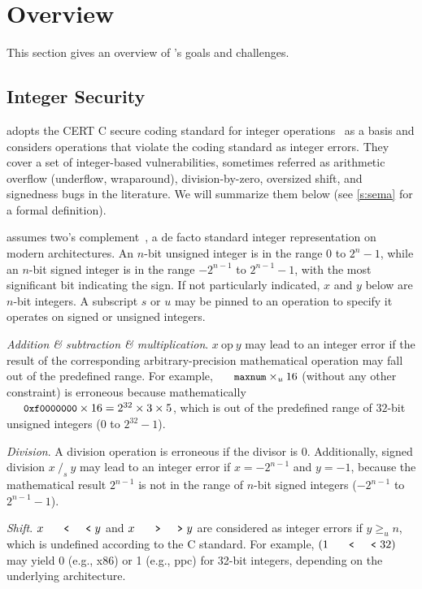\section{Overview}
\label{s:oview}

This section gives an overview of \sys's goals and challenges.

\subsection{Integer Security}
\label{s:goal}

\sys adopts the CERT C secure coding standard for integer
operations~\cite[\chapterautorefname~5]{seacord:secure-c} as a basis
and considers operations that violate the coding standard as integer
errors.  They cover a set of integer-based vulnerabilities, sometimes
referred as arithmetic overflow (underflow, wraparound), division-by-zero,
oversized shift, and signedness bugs in the literature.  We will
summarize them below (see \autoref{s:sema} for a formal definition).

\sys assumes two's complement~\cite[\chapterautorefname~4.2.1]{intel:vol1},
a de facto standard integer representation on modern architectures.
An $n$-bit unsigned integer is in the range $0$ to $2^n-1$, while
an $n$-bit signed integer is in the range $-2^{n-1}$ to $2^{n-1}-1$,
with the most significant bit indicating the sign.  If not particularly
indicated, $x$ and $y$ below are $n$-bit integers.  A subscript $s$
or $u$ may be pinned to an operation to specify it operates on
signed or unsigned integers.

\noindent
{\it Addition \& subtraction \& multiplication}.
$x\ \textrm{op}\ y$ may lead to an integer error if the result of
the corresponding arbitrary-precision mathematical operation may
fall out of the predefined range.  For example, $\cc{maxnum}\times_u
16$ (without any other constraint) is erroneous because mathematically
$\cc{0xf0000000} \times 16 = 2^{32}\times 3\times 5$, which is out
of the predefined range of $32$-bit unsigned integers ($0$ to $2^{32}
- 1$).

\noindent
{\it Division}.
A division operation is erroneous if the divisor is 0.  Additionally,
signed division $x\ /_s\ y$ may lead to an integer error if $x =
-2^{n-1}$ and $y = -1$, because the mathematical result $2^{n-1}$
is not in the range of $n$-bit signed integers ($-2^{n-1}$ to
$2^{n-1}-1$).

\noindent
{\it Shift}. $x \shl y$ and $x \shr y$ are considered as integer
errors if $y \geq_u n$, which is undefined according to the C
standard.  For example, $(1 \shl 32)$ may yield 0 (e.g., x86) or 1
(e.g., ppc) for 32-bit integers, depending on the underlying
architecture.


